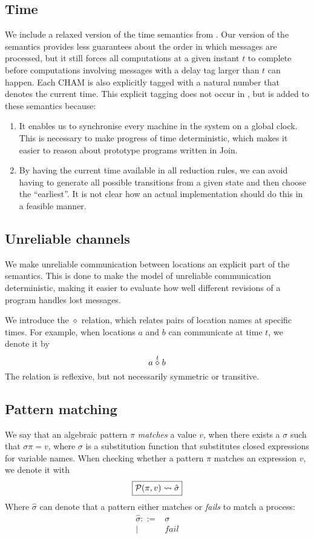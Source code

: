 \subsection{Time}
We include a relaxed version of the time semantics from \cite{timed-join}. Our
version of the semantics provides less guarantees about the order in which
messages are processed, but it still forces all computations at a given instant
$t$ to complete before computations involving messages with a delay tag larger
than $t$ can happen. Each CHAM is also explicitly tagged with a natural number
that denotes the current time. This explicit tagging does not occur in
\cite{timed-join}, but is added to these semantics because:
\begin{enumerate}
 \item It enables us to synchronise every machine in the system on a global
 clock. This is necessary to make progress of time deterministic, which makes
 it easier to reason about prototype programs written in Join.
 \item By having the current time available in all reduction rules, we can
 avoid having to generate all possible transitions from a given state and then
 choose the ``earliest''. It is not clear how an actual implementation should
 do this in a feasible manner.
\end{enumerate}

\subsection{Unreliable channels}
We make unreliable communication between locations an explicit part of the
semantics. This is done to make the model of unreliable communication
deterministic, making it easier to evaluate how well different revisions of a
program handles lost messages.

We introduce the $\diamond$ relation, which relates pairs of location names at
specific times. For example, when locations $a$ and $b$ can communicate at time
$t$, we denote it by
\begin{equation*}
 a \linkUp{t} b
\end{equation*}
The relation is reflexive, but not necessarily symmetric or transitive.


\subsection{Pattern matching}
We say that an algebraic pattern $\pi$ \emph{matches} a value $v$, when there
exists a $\sigma$ such that $\sigma \pi = v$, where $\sigma$ is a substitution
function that substitutes closed expressions for variable names.  When checking
whether a pattern $\pi$ matches an expression $v$, we denote it with
\begin{equation*}
  \boxed{\P(\pi,v) \leadsto \hat\sigma}
\end{equation*}
Where $\hat\sigma$ can denote that a pattern either matches or \emph{fails} to
match a process:
\begin{align*}
 \hat\sigma ::={}& \sigma \\
         |\quad{}& fail
\end{align*}

